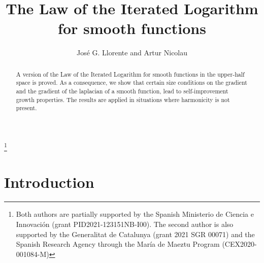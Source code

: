\documentclass[11pt,letterpaper]{amsart}
\theoremstyle{definition}
\numberwithin{equation}{section}
\begin{document}
\title{The Law of the Iterated Logarithm for smooth functions}

\author[Jos\'e G. Llorente, A. Nicolau]{Jos\'e G. Llorente and Artur Nicolau}

\address{J. G. Llorente: Departamento de An\'alisis Matem\'atico y Matem\'atica Aplicada. Facultad de Matem\'aticas. Universidad Complutense de Madrid.}


\address{A. Nicolau: Departament de Matem{\`a}tiques\\
Universitat Aut\`onoma de Barcelona\\ and Centre de Recerca Matem{\`a}tica \\08193 Barcelona}






\thanks{Both authors are partially supported by the Spanish Ministerio de Ciencia e Innovaci\'on (grant PID2021-123151NB-I00). The second author is also supported by  the Generalitat de Catalunya (grant 2021 SGR 00071) and the Spanish Research
Agency through the María de Maeztu Program (CEX2020-001084-M)}





\begin{abstract}
    A version of the Law of the Iterated Logarithm for smooth functions in the upper-half space is proved. As a consequence, we show that certain size conditions on the gradient and the gradient of the laplacian of a smooth function, lead to self-improvement growth properties. The results are applied in situations where harmonicity is not present.   
\end{abstract}

\maketitle



\section{Introduction}
\end{document}

